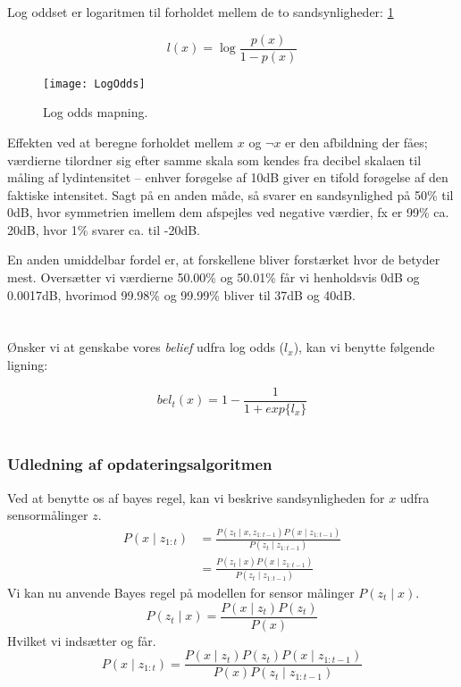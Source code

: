 Log oddset er logaritmen til forholdet mellem de to sandsynligheder: \cref{logoddsimg}

\begin{equation}
l(x) = \log \frac{p(x)}{1 - p(x)}
\end{equation}

\begin{figure}
\centering \texttt{[image: LogOdds]}
\caption{Log odds mapning.}
\label{logoddsimg}
\end{figure}

Effekten ved at beregne forholdet mellem $x$ og $\neg x$ er den afbildning der fåes; værdierne tilordner sig efter samme skala som kendes fra decibel skalaen til måling af lydintensitet -- enhver forøgelse af 10dB giver en tifold forøgelse af den faktiske intensitet.
Sagt på en anden måde, så svarer en sandsynlighed på 50\% til 0dB, hvor symmetrien imellem dem afspejles ved negative værdier, fx er 99\% ca. 20dB, hvor 1\% svarer ca. til -20dB.

En anden umiddelbar fordel er, at forskellene bliver forstærket hvor de betyder mest.
Oversætter vi værdierne 50.00\% og 50.01\% får vi henholdsvis 0dB og 0.0017dB, hvorimod 99.98\% og 99.99\% bliver til 37dB og 40dB. \\ \\
\cite[s. 2]{logodds} \\

Ønsker vi at genskabe vores \textit{belief} udfra log odds ($l_x$), kan vi benytte følgende ligning:

\begin{equation}
	bel_t(x) = 1 - \frac{1}{1 + exp\{l_x\}}\label{logodds:bel}
\end{equation}
\\
\cite[s. 95]{probabilisticRobotics} 

\subsubsection{Udledning af opdateringsalgoritmen}
Ved at benytte os af bayes regel, kan vi beskrive sandsynligheden for $x$ udfra sensormålinger $z$.
\begin{equation}
\begin{split}
	P(x \mid z_{1:t}) &= \frac{P(z_t \mid x, z_{1:t-1}) P(x \mid z_{1:t-1})}{P(z_t \mid z_{1:t-1})} \\
	&= \frac{P(z_t \mid x) P(x \mid z_{1:t-1})}{P(z_t \mid z_{1:t-1})}
\end{split}
\end{equation}
Vi kan nu anvende Bayes regel på modellen for sensor målinger $P(z_t \mid x)$.
\begin{equation}
P(z_t \mid x) = \frac{P(x \mid z_t) P(z_t)}{P(x)}
\end{equation}
Hvilket vi indsætter og får.
\begin{equation}
P(x \mid z_{1:t}) = \frac{P(x \mid z_t) P(z_t) P(x \mid z_{1:t-1})}{P(x) P(z_t \mid z_{1:t-1})}
\end{equation}
 \\
\cite[s. 95]{probabilisticRobotics} \\

